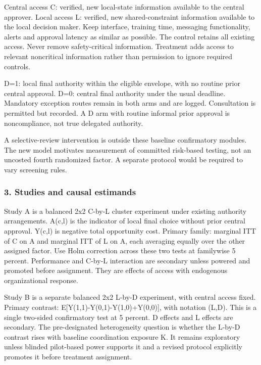 \documentclass[
  11pt,
]{article}
\begin{document}
Central access C: verified, new local-state information available to the
central approver. Local access L: verified, new shared-constraint
information available to the local decision maker. Keep interface,
training time, messaging functionality, alerts and approval latency as
similar as possible. The control retains all existing access. Never
remove safety-critical information. Treatment adds access to relevant
noncritical information rather than permission to ignore required
controls.

D=1: local final authority within the eligible envelope, with no routine
prior central approval. D=0: central final authority under the usual
deadline. Mandatory exception routes remain in both arms and are logged.
Consultation is permitted but recorded. A D arm with routine informal
prior approval is noncompliance, not true delegated authority.

A selective-review intervention is outside these baseline confirmatory
modules. The new model motivates measurement of committed risk-based
testing, not an uncosted fourth randomized factor. A separate protocol
would be required to vary screening rules.

\subsubsection{3. Studies and causal
estimands}\label{studies-and-causal-estimands}

Study A is a balanced 2x2 C-by-L cluster experiment under existing
authority arrangements. A(c,l) is the indicator of local final choice
without prior central approval. Y(c,l) is negative total opportunity
cost. Primary family: marginal ITT of C on A and marginal ITT of L on A,
each averaging equally over the other assigned factor. Use Holm
correction across these two tests at familywise 5 percent. Performance
and C-by-L interaction are secondary unless powered and promoted before
assignment. They are effects of access with endogenous organizational
response.

Study B is a separate balanced 2x2 L-by-D experiment, with central
access fixed. Primary contrast: E{[}Y(1,1)-Y(0,1)-Y(1,0)+Y(0,0){]}, with
notation (L,D). This is a single two-sided confirmatory test at 5
percent. D effects and L effects are secondary. The pre-designated
heterogeneity question is whether the L-by-D contrast rises with
baseline coordination exposure K. It remains exploratory unless blinded
pilot-based power supports it and a revised protocol explicitly promotes
it before treatment assignment.
\end{document}
